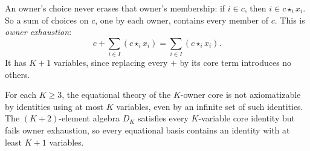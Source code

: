 An owner's choice never erases that owner's membership: if $i\in c$, then
$i\in c\star_i x_i$. So a sum of choices on $c$, one by each owner, contains
every member of $c$. This is \emph{owner exhaustion}:
\begin{equation}\label{core:eq:exhaustion}
 c+\sum_{i\in I}(c\star_i x_i)
   =\sum_{i\in I}(c\star_i x_i).
\end{equation}
It has $K+1$ variables, since replacing every $+$ by its core term introduces
no others.

\begin{proposition}\label{core:prop:basis-arity}
For each $K\geq3$, the equational theory of the $K$-owner core is not
axiomatizable by identities using at most $K$ variables, even by an
infinite set of such identities. The $(K+2)$-element algebra $D_K$ satisfies
every $K$-variable core identity but fails owner exhaustion, so every
equational basis contains an identity with at least $K+1$ variables.
\end{proposition}

